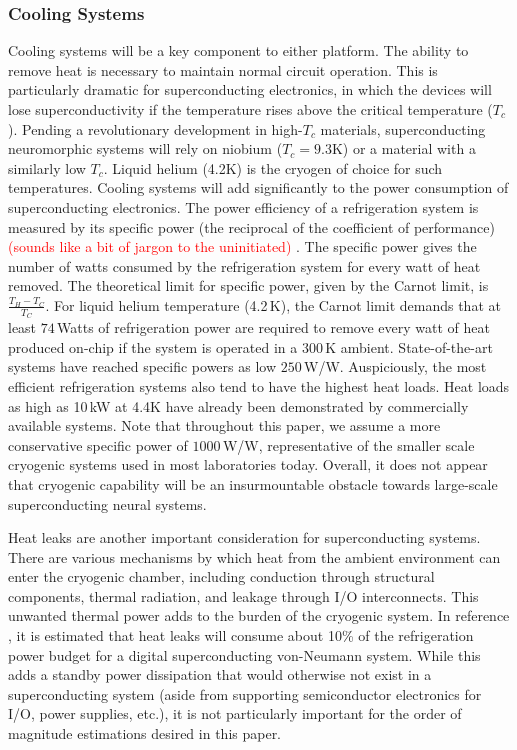 \documentclass[twocolumn]{article}
\begin{document}
\subsubsection{Cooling Systems}
Cooling systems will be a key component to either platform. The ability to remove heat is necessary to maintain normal circuit operation. This is particularly dramatic for superconducting electronics, in which the devices will lose superconductivity if the temperature rises above the critical temperature ($T_c$). Pending a revolutionary development in high-$T_c$ materials, superconducting neuromorphic systems will rely on niobium ($T_c = 9.3$K) or a material with a similarly low $T_c$. Liquid helium (4.2K) is the cryogen of choice for such temperatures. Cooling systems will add significantly to the power consumption of superconducting electronics. The power efficiency of a refrigeration system is measured by its specific power (the reciprocal of the coefficient of performance) \textcolor{red}{(sounds like a bit of jargon to the uninitiated)} \cite{}. The specific power gives the number of watts consumed by the refrigeration system for every watt of heat removed. The theoretical limit for specific power, given by the Carnot limit, is $\frac{T_H - T_C}{T_C}$. For liquid helium temperature (4.2\,K), the Carnot limit demands that at least $74$\,Watts of refrigeration power are required to remove every watt of heat produced on-chip if the system is operated in a 300\,K ambient. State-of-the-art systems have reached specific powers as low $250$\,W/W. Auspiciously, the most efficient refrigeration systems also tend to have the highest heat loads. Heat loads as high as 10\,kW at 4.4K have already been demonstrated by commercially available systems. Note that throughout this paper, we assume a more conservative specific power of $1000$\,W/W, representative of the smaller scale cryogenic systems used in most laboratories today. Overall, it does not appear that cryogenic capability will be an insurmountable obstacle towards large-scale superconducting neural systems.

Heat leaks are another important consideration for superconducting systems. There are various mechanisms by which heat from the ambient environment can enter the cryogenic chamber, including conduction through structural components, thermal radiation, and leakage through I/O interconnects. This unwanted thermal power adds to the burden of the cryogenic system. In reference \cite{holmes2013energy}, it is estimated that heat leaks will consume about 10\% of the refrigeration power budget for a digital superconducting von-Neumann system. While this adds a standby power dissipation that would otherwise not exist in a superconducting system (aside from supporting semiconductor electronics for I/O, power supplies, etc.), it is not particularly important for the order of magnitude estimations desired in this paper.
\end{document}
